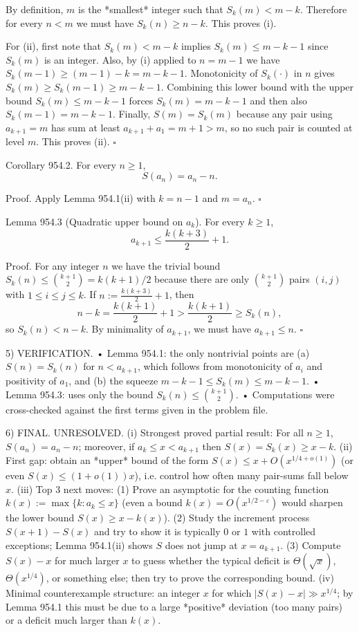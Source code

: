 By definition, $m$ is the *smallest* integer such that $S_k(m)<m-k$. Therefore for every $n<m$ we must have $S_k(n)\ge n-k$. This proves (i).

For (ii), first note that $S_k(m)<m-k$ implies $S_k(m)\le m-k-1$ since $S_k(m)$ is an integer.
Also, by (i) applied to $n=m-1$ we have
$S_k(m-1)\ge (m-1)-k=m-k-1$.
Monotonicity of $S_k(\cdot)$ in $n$ gives $S_k(m)\ge S_k(m-1)\ge m-k-1$.
Combining this lower bound with the upper bound $S_k(m)\le m-k-1$ forces
$S_k(m)=m-k-1$ and then also $S_k(m-1)=m-k-1$.
Finally, $S(m)=S_k(m)$ because any pair using $a_{k+1}=m$ has sum at least $a_{k+1}+a_1=m+1>m$, so no such pair is counted at level $m$.
This proves (ii). \hfill $\square$

Corollary 954.2.
For every $n\ge 1$,
\[
S(a_n)=a_n-n.
\]

Proof.
Apply Lemma 954.1(ii) with $k=n-1$ and $m=a_n$. \hfill $\square$

Lemma 954.3 (Quadratic upper bound on $a_{k}$).
For every $k\ge 1$,
\[
a_{k+1}\le \frac{k(k+3)}{2}+1.
\]

Proof.
For any integer $n$ we have the trivial bound $S_k(n)\le \binom{k+1}{2}=k(k+1)/2$ because there are only $\binom{k+1}{2}$ pairs $(i,j)$ with $1\le i\le j\le k$.
If $n:=\frac{k(k+3)}{2}+1$, then
\[
n-k=\frac{k(k+1)}{2}+1>\frac{k(k+1)}{2}\ge S_k(n),
\]
so $S_k(n)<n-k$. By minimality of $a_{k+1}$, we must have $a_{k+1}\le n$.
\hfill $\square$

5) VERIFICATION.
• Lemma 954.1: the only nontrivial points are (a) $S(n)=S_k(n)$ for $n<a_{k+1}$, which follows from monotonicity of $a_i$ and positivity of $a_1$, and (b) the squeeze $m-k-1\le S_k(m)\le m-k-1$.
• Lemma 954.3: uses only the bound $S_k(n)\le \binom{k+1}{2}$.
• Computations were cross-checked against the first terms given in the problem file.

6) FINAL.
UNRESOLVED.
(i) Strongest proved partial result: For all $n\ge 1$, $S(a_n)=a_n-n$; moreover, if $a_k\le x<a_{k+1}$ then $S(x)=S_k(x)\ge x-k$.
(ii) First gap: obtain an *upper* bound of the form $S(x)\le x+O(x^{1/4+o(1)})$ (or even $S(x)\le (1+o(1))x$), i.e. control how often many pair-sums fall below $x$.
(iii) Top 3 next moves:
  (1) Prove an asymptotic for the counting function $k(x):=\max\{k: a_k\le x\}$ (even a bound $k(x)=O(x^{1/2-\varepsilon})$ would sharpen the lower bound $S(x)\ge x-k(x)$).
  (2) Study the increment process $S(x+1)-S(x)$ and try to show it is typically $0$ or $1$ with controlled exceptions; Lemma 954.1(ii) shows $S$ does not jump at $x=a_{k+1}$.
  (3) Compute $S(x)-x$ for much larger $x$ to guess whether the typical deficit is $\Theta(\sqrt{x})$, $\Theta(x^{1/4})$, or something else; then try to prove the corresponding bound.
(iv) Minimal counterexample structure: an integer $x$ for which $|S(x)-x|\gg x^{1/4}$; by Lemma 954.1 this must be due to a large *positive* deviation (too many pairs) or a deficit much larger than $k(x)$.



